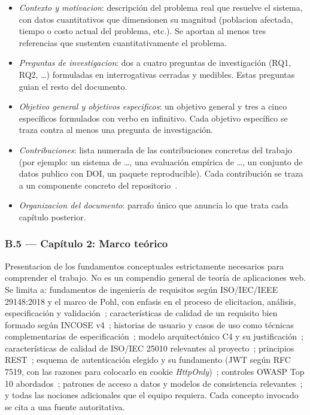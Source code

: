 \documentclass[11pt,a4paper]{article}
\begin{document}
\begin{itemize}
    \item \emph{Contexto y motivacion}: descripci\'{o}n del problema real que resuelve el sistema, con datos cuantitativos que dimensionen su magnitud (poblacion afectada, tiempo o costo actual del problema, etc.). Se aportan al menos tres referencias que sustenten cuantitativamente el problema.
    \item \emph{Preguntas de investigacion}: dos a cuatro preguntas de investigaci\'{o}n (RQ1, RQ2, \ldots) formuladas en interrogativas cerradas y medibles. Estas preguntas guian el resto del documento.
    \item \emph{Objetivo general y objetivos especificos}: un objetivo general y tres a cinco espec\'{i}ficos formulados con verbo en infinitivo. Cada objetivo espec\'{i}fico se traza contra al menos una pregunta de investigaci\'{o}n.
    \item \emph{Contribuciones}: lista numerada de las contribuciones concretas del trabajo (por ejemplo: un sistema de \ldots, una evaluaci\'{o}n emp\'{i}rica de \ldots, un conjunto de datos publico con DOI, un paquete reproducible). Cada contribuci\'{o}n se traza a un componente concreto del repositorio~\cite{peffers2007design}.
    \item \emph{Organizacion del documento}: parrafo \'{u}nico que anuncia lo que trata cada cap\'{i}tulo posterior.
\end{itemize}

\subsubsection*{B.5 --- Cap\'{i}tulo 2: Marco te\'{o}rico}

Presentacion de los fundamentos conceptuales estrictamente necesarios para comprender el trabajo. No es un compendio general de teor\'{i}a de aplicaciones web. Se limita a: fundamentos de ingenier\'{i}a de requisitos seg\'{u}n ISO/IEC/IEEE 29148:2018 y el marco de Pohl, con enfasis en el proceso de elicitacion, an\'{a}lisis, especificaci\'{o}n y validaci\'{o}n~\cite{iso29148,pohl2010requirements,wiegers2013software}; caracter\'{i}sticas de calidad de un requisito bien formado seg\'{u}n INCOSE v4~\cite{incose2023requirements}; historias de usuario y casos de uso como t\'{e}cnicas complementarias de especificaci\'{o}n~\cite{cohn2004user,cockburn2001writing}; modelo arquitect\'{o}nico C4 y su justificaci\'{o}n~\cite{brown2023c4}; caracter\'{i}sticas de calidad de ISO/IEC 25010 relevantes al proyecto~\cite{iso25010}; principios REST~\cite{fielding2000rest}; esquema de autenticaci\'{o}n elegido y su fundamento (JWT seg\'{u}n RFC 7519, con las razones para colocarlo en cookie \emph{HttpOnly})~\cite{jones2015jwt}; controles OWASP Top 10 abordados~\cite{owasp2021top10,ortega2022securecoding}; patrones de acceso a datos y modelos de consistencia relevantes~\cite{kleppmann2017designing,bass2021software,richards2020fundamentals}; y todas las nociones adicionales que el equipo requiera. Cada concepto invocado se cita a una fuente autoritativa.
\end{document}
